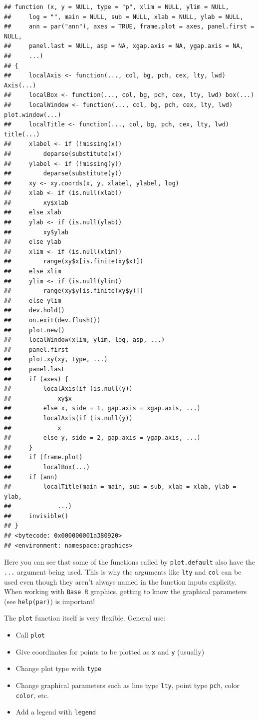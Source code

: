 \documentclass[
]{book}
\providecommand{\tightlist}{%
  \setlength{\itemsep}{0pt}\setlength{\parskip}{0pt}}
\theoremstyle{definition}
\theoremstyle{definition}
\theoremstyle{definition}
\theoremstyle{remark}
\begin{document}
\begin{verbatim}
## function (x, y = NULL, type = "p", xlim = NULL, ylim = NULL, 
##     log = "", main = NULL, sub = NULL, xlab = NULL, ylab = NULL, 
##     ann = par("ann"), axes = TRUE, frame.plot = axes, panel.first = NULL, 
##     panel.last = NULL, asp = NA, xgap.axis = NA, ygap.axis = NA, 
##     ...) 
## {
##     localAxis <- function(..., col, bg, pch, cex, lty, lwd) Axis(...)
##     localBox <- function(..., col, bg, pch, cex, lty, lwd) box(...)
##     localWindow <- function(..., col, bg, pch, cex, lty, lwd) plot.window(...)
##     localTitle <- function(..., col, bg, pch, cex, lty, lwd) title(...)
##     xlabel <- if (!missing(x)) 
##         deparse(substitute(x))
##     ylabel <- if (!missing(y)) 
##         deparse(substitute(y))
##     xy <- xy.coords(x, y, xlabel, ylabel, log)
##     xlab <- if (is.null(xlab)) 
##         xy$xlab
##     else xlab
##     ylab <- if (is.null(ylab)) 
##         xy$ylab
##     else ylab
##     xlim <- if (is.null(xlim)) 
##         range(xy$x[is.finite(xy$x)])
##     else xlim
##     ylim <- if (is.null(ylim)) 
##         range(xy$y[is.finite(xy$y)])
##     else ylim
##     dev.hold()
##     on.exit(dev.flush())
##     plot.new()
##     localWindow(xlim, ylim, log, asp, ...)
##     panel.first
##     plot.xy(xy, type, ...)
##     panel.last
##     if (axes) {
##         localAxis(if (is.null(y)) 
##             xy$x
##         else x, side = 1, gap.axis = xgap.axis, ...)
##         localAxis(if (is.null(y)) 
##             x
##         else y, side = 2, gap.axis = ygap.axis, ...)
##     }
##     if (frame.plot) 
##         localBox(...)
##     if (ann) 
##         localTitle(main = main, sub = sub, xlab = xlab, ylab = ylab, 
##             ...)
##     invisible()
## }
## <bytecode: 0x000000001a380920>
## <environment: namespace:graphics>
\end{verbatim}

Here you can see that some of the functions called by \texttt{plot.default} also have the \texttt{...} argument being used. This is why the arguments like \texttt{lty} and \texttt{col} can be used even though they aren't always named in the function inputs explicity. When working with \texttt{Base\ R} graphics, getting to know the graphical parameters (see \texttt{help(par)}) is important!

The \texttt{plot} function itself is very flexible. General use:

\begin{itemize}
\tightlist
\item
  Call \texttt{plot}\\
\item
  Give coordinates for points to be plotted as \texttt{x} and \texttt{y} (usually)\\
\item
  Change plot type with \texttt{type}\\
\item
  Change graphical parameters such as line type \texttt{lty}, point type \texttt{pch}, color \texttt{color}, etc.\\
\item
  Add a legend with \texttt{legend}
\end{itemize}
\end{document}
